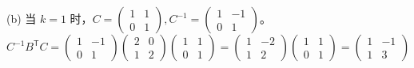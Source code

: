 \begin{questions}
\begin{solution}
(b) 当 $k=1$ 时，$C = \begin{pmatrix} 1 & 1 \\ 0 & 1 \end{pmatrix}, C^{-1} = \begin{pmatrix} 1 & -1 \\ 0 & 1 \end{pmatrix}$。
\[
C^{-1} B^{\mathsf{T}} C = \begin{pmatrix} 1 & -1 \\ 0 & 1 \end{pmatrix} \begin{pmatrix} 2 & 0 \\ 1 & 2 \end{pmatrix} \begin{pmatrix} 1 & 1 \\ 0 & 1 \end{pmatrix} = \begin{pmatrix} 1 & -2 \\ 1 & 2 \end{pmatrix} \begin{pmatrix} 1 & 1 \\ 0 & 1 \end{pmatrix} = \begin{pmatrix} 1 & -1 \\ 1 & 3 \end{pmatrix}
\]


\end{solution}
\end{questions}
